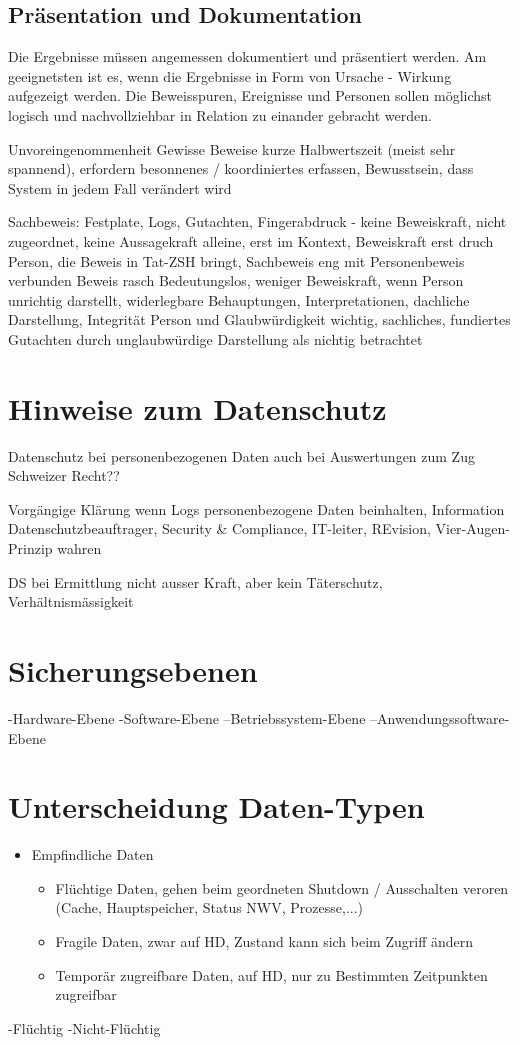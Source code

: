 \subsection{Präsentation und Dokumentation}
Die Ergebnisse müssen angemessen dokumentiert und präsentiert werden. Am geeignetsten ist es, wenn die Ergebnisse in Form von Ursache - Wirkung aufgezeigt werden. Die Beweisspuren, Ereignisse und Personen sollen möglichst logisch und nachvollziehbar in Relation zu einander gebracht werden.





Unvoreingenommenheit
Gewisse Beweise kurze Halbwertszeit (meist sehr spannend), erfordern besonnenes / koordiniertes erfassen, Bewusstsein, dass System in jedem Fall verändert wird

Sachbeweis: Festplate, Logs, Gutachten, Fingerabdruck - keine Beweiskraft, nicht zugeordnet, keine Aussagekraft alleine, erst im Kontext, Beweiskraft erst druch Person, die Beweis in Tat-ZSH bringt, Sachbeweis eng mit Personenbeweis verbunden
Beweis rasch Bedeutungslos, weniger Beweiskraft, wenn Person unrichtig darstellt, widerlegbare Behauptungen, Interpretationen, dachliche Darstellung, Integrität Person und Glaubwürdigkeit wichtig, sachliches, fundiertes Gutachten durch unglaubwürdige Darstellung als nichtig betrachtet

\section{Hinweise zum Datenschutz}
Datenschutz bei personenbezogenen Daten auch bei Auswertungen zum Zug
Schweizer Recht??

Vorgängige Klärung wenn Logs personenbezogene Daten beinhalten, Information Datenschutzbeauftrager, Security \& Compliance, IT-leiter, REvision, Vier-Augen-Prinzip wahren

DS bei Ermittlung nicht ausser Kraft, aber kein Täterschutz, Verhältnismässigkeit



\section{Sicherungsebenen}
-Hardware-Ebene
-Software-Ebene
--Betriebssystem-Ebene
--Anwendungssoftware-Ebene

\section{Unterscheidung Daten-Typen}
\begin{itemize}
\item Empfindliche Daten
\begin{itemize}
\item Flüchtige Daten, gehen beim geordneten Shutdown / Ausschalten veroren (Cache, Hauptspeicher, Status NWV, Prozesse,...)
\item Fragile Daten, zwar auf HD, Zustand kann sich beim Zugriff ändern
\item Temporär zugreifbare Daten, auf HD, nur zu Bestimmten Zeitpunkten zugreifbar
\end{itemize}
\end{itemize}
-Flüchtig
-Nicht-Flüchtig

